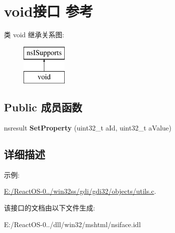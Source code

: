 \hypertarget{interfacevoid}{}\section{void接口 参考}
\label{interfacevoid}
类 void 继承关系图\+:\begin{figure}[H]
\begin{center}
\leavevmode
\includegraphics[height=2.000000cm]{interfacevoid}
\end{center}
\end{figure}
\subsection*{Public 成员函数}
\begin{DoxyCompactItemize}
\item 
\mbox{\label{interfacevoid_a6276fa73eeb560c217224ca512294d01}} 
nsresult {\bfseries Set\+Property} (uint32\+\_\+t a\+Id, uint32\+\_\+t a\+Value)
\end{DoxyCompactItemize}


\subsection{详细描述}
\begin{Desc}
\item[示例\+: ]\par
\hyperlink{_e_1_2_react_o_s-0_84_86_2win32ss_2gdi_2gdi32_2objects_2utils_8c-example}{E\+:/\+React\+O\+S-\/0../win32ss/gdi/gdi32/objects/utils.\+c}.\end{Desc}


该接口的文档由以下文件生成\+:\begin{DoxyCompactItemize}
\item 
E\+:/\+React\+O\+S-\/0../dll/win32/mshtml/nsiface.\+idl\end{DoxyCompactItemize}
